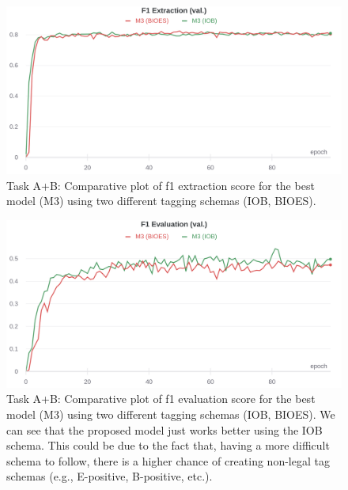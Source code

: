 \documentclass[11pt,a4paper]{article}
\begin{document}
	\begin{figure}[H]
		\centering
		\includegraphics[width=1\columnwidth]{M3_ab_IOB_vs_BIOES_f1_extr.png}
		\caption{Task A+B: Comparative plot of f1 extraction score for the best model (M3) using two different tagging schemas (IOB, BIOES).}
		\label{fig:IOB_vs_BIOES_extr}
	\end{figure}
	
	\begin{figure}[H]
		\centering
		\includegraphics[width=1\columnwidth]{M3_ab_IOB_vs_BIOES_f1_eval.png}
		\caption{Task A+B: Comparative plot of f1 evaluation score for the best model (M3) using two different tagging schemas (IOB, BIOES). We can see that the proposed model just works better using the IOB schema. This could be due to the fact that, having a more difficult schema to follow, there is a higher chance of creating non-legal tag schemas (e.g., E-positive, B-positive, etc.).}
		\label{fig:IOB_vs_BIOES_eval}
	\end{figure}
	
\end{document}

